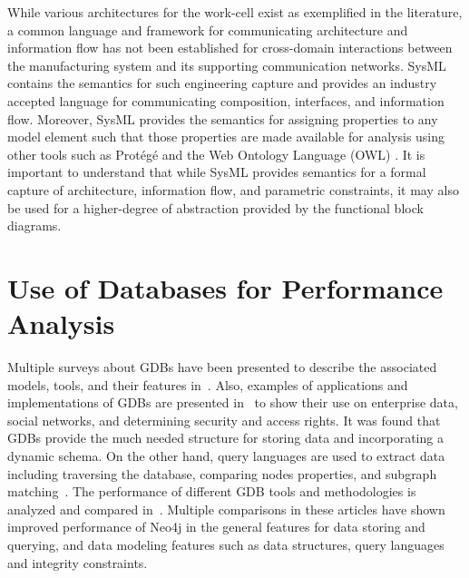 While various architectures for the work-cell exist as exemplified in the literature, a common language and framework for communicating architecture and information flow has not been established for cross-domain interactions between the manufacturing system and its supporting communication networks.
SysML contains the semantics for such engineering capture and provides an industry accepted language for communicating composition, interfaces, and information flow. Moreover, SysML provides the semantics for assigning properties to any model element such that those properties are made  available for analysis using other tools such as Prot\'eg\'e \cite{StanfordUniversity.Protege} and the Web Ontology Language (OWL) \cite{W3C2012.OWL}.
It is important to understand that while SysML provides semantics for a formal capture of architecture, information flow, and parametric constraints, it may also be used for a higher-degree of abstraction provided by the functional block diagrams.  

\chapter{Use of Databases for Performance Analysis}

\chapterintro*

\blindtext

Multiple surveys about GDBs have been presented to describe the associated models, tools, and their features in~\cite{Angles:2008:SGD:1322432.1322433,7148480,GDB_overview}. Also, examples of applications and implementations of GDBs are presented in~\cite{modern_models} to show their use on enterprise data, social networks, and determining security and access rights. It was found that GDBs provide the much needed structure for storing data and incorporating a dynamic schema. On the other hand, query languages are used to extract data including traversing the database, comparing nodes properties, and subgraph matching~\cite{Wood2012QueryLF}. The performance of different GDB tools and methodologies is analyzed and compared in~\cite{Jadhav2015ComparativeAO,Macko:2013:PIG:2485732.2485750}. Multiple comparisons in these articles have shown improved performance of Neo4j in the general features for data storing and querying, and data modeling features such as data structures, query languages and integrity constraints. 

